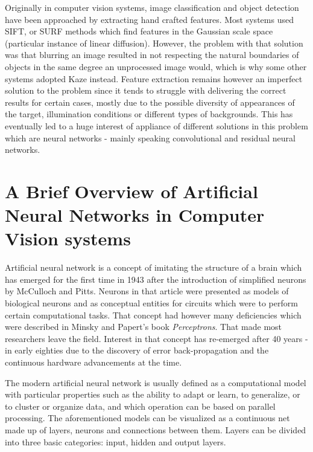 \documentclass{ijisa}
\begin{document}
Originally in computer vision systems, image classification and object detection have been approached by extracting hand crafted features. Most systems used SIFT\cite{lowe2004distinctive}, or SURF methods which find features in the Gaussian scale space (particular instance of linear diffusion). However, the problem with that solution was that blurring an image resulted in not respecting the natural boundaries of objects in the same degree an unprocessed image would, which is why some other systems adopted Kaze\cite{Alcantarilla13bmvc} instead. Feature extraction remains however an imperfect solution to the problem since it tends to struggle with delivering the correct results for certain cases, mostly due to the possible diversity of appearances of the target, illumination conditions or different types of backgrounds. This has eventually led to a huge interest of appliance of different solutions in this problem which are neural networks - mainly speaking convolutional and residual neural networks. 

\section{A Brief Overview of Artificial Neural Networks in Computer Vision systems}

Artificial neural network is a concept of imitating the structure of a brain which has emerged for the first time in 1943 after the introduction of simplified neurons by McCulloch and Pitts\cite{mcculloch1943logical}. Neurons in that article were presented as models of biological neurons and as conceptual entities for circuits which were to perform certain computational tasks. That concept had however many deficiencies which were described in Minsky and Papert's book \textit{Perceptrons}\cite{minsky2017perceptrons}. That made most researchers leave the field. Interest in that concept has re-emerged after 40 years - in early eighties due to the discovery of error back-propagation and the continuous hardware advancements at the time.

The modern artificial neural network is usually defined as a computational model with particular properties such as the ability to adapt or learn, to generalize, or to cluster or organize data, and which operation can be based on parallel processing\cite{krose1993introduction}. The aforementioned models can be visualized as a continuous net made up of layers, neurons and connections between them. Layers can be divided into three basic categories: input, hidden and output layers. 
\end{document}
